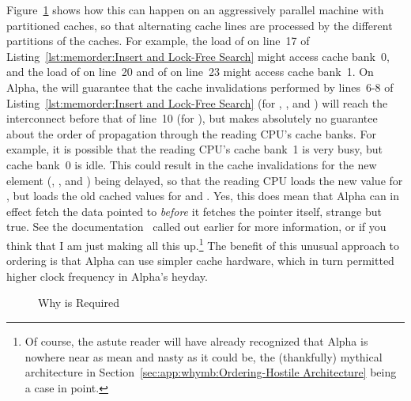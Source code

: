 Figure~\ref{fig:memorder:Why smp-read-barrier-depends() is Required}
shows how this can happen on
an aggressively parallel machine with partitioned caches, so that
alternating cache lines are processed by the different partitions
of the caches.
For example, the load of  on line~17 of
Listing~\ref{lst:memorder:Insert and Lock-Free Search}
might access cache bank~0,
and the load of  on line~20 and of  on line~23
might access cache bank~1.
On Alpha, the  will guarantee that the cache invalidations
performed by lines~6-8 of
Listing~\ref{lst:memorder:Insert and Lock-Free Search}
(for , , and ) will reach
the interconnect before that of line~10 (for ), but
makes absolutely no guarantee about the order of
propagation through the reading CPU's cache banks.
For example, it is possible that the reading CPU's cache bank~1 is very
busy, but cache bank~0 is idle.
This could result in the cache invalidations for the new element
(, , and ) being
delayed, so that the reading CPU loads the new value for ,
but loads the old cached values for  and .
Yes, this does mean that Alpha can in effect fetch
the data pointed to {\em before} it fetches the pointer itself, strange
but true.
See the documentation~\cite{Compaq01,WilliamPugh2000Gharachorloo}
called out earlier for more information,
or if you think that I am just making all this up.\footnote{
	Of course, the astute reader will have already recognized that
	Alpha is nowhere near as mean and nasty as it could be,
	the (thankfully) mythical architecture in
	Section~\ref{sec:app:whymb:Ordering-Hostile Architecture}
	being a case in point.}
The benefit of this unusual approach to ordering is that Alpha can use
simpler cache hardware, which in turn permitted higher clock frequency
in Alpha's heyday.

\begin{figure}[tbp]
\centering
{}
\caption{Why  is Required}
\label{fig:memorder:Why smp-read-barrier-depends() is Required}
\end{figure}

